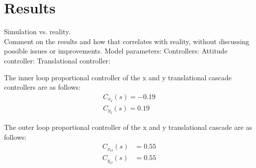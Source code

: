 \section{Results}
Simulation vs. reality. \\
Comment on the results and how that correlates with reality, without discussing possible issues or improvements.
Model parameters: 
Controllers:
Attitude controller:
Translational controller:

The inner loop proportional controller of the x and y translational cascade controllers are as follows:
\begin{align}
C_{\dot{x_I}}(s)= -0.19\\
C_{\dot{y_I}}(s)= 0.19
\end{align}

The outer loop  proportional controller of the x and y translational cascade are as follows:
\begin{align}
C_{\dot{x_O}}(s)&= 0.55\\
C_{\dot{y_O}}(s)&= 0.55
\end{align}
